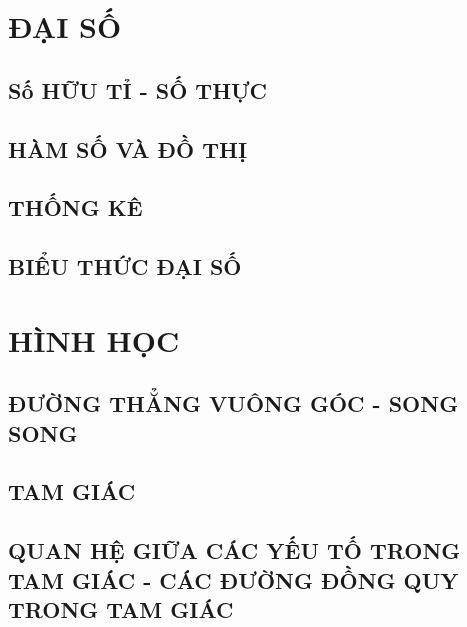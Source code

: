 \documentclass[12pt,a4paper,oneside]{book}
\theoremstyle{nonumberplain}
\begin{document}
\tableofcontents
\part{ĐẠI SỐ}
\chapter{Số HỮU TỈ - SỐ THỰC}



\chapter{HÀM SỐ VÀ ĐỒ THỊ}


\chapter{THỐNG KÊ}


\chapter{BIỂU THỨC ĐẠI SỐ}


\part{HÌNH HỌC}\setcounter{chapter}{0}
\chapter{ĐƯỜNG THẲNG VUÔNG GÓC - SONG SONG}




\chapter{TAM GIÁC}





\chapter{QUAN HỆ GIỮA CÁC YẾU TỐ TRONG TAM GIÁC - CÁC ĐƯỜNG ĐỒNG QUY TRONG TAM GIÁC}







\end{document}
